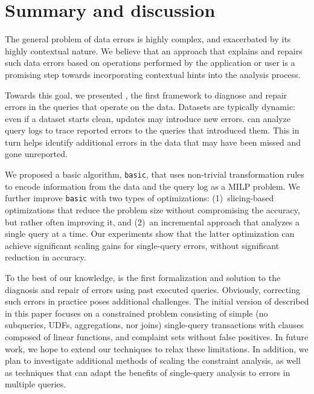 

\section{Summary and discussion}

The general problem of data errors is highly complex, and exacerbated by its highly contextual nature.
We believe that an approach that explains and repairs such data errors based on operations performed by the application or user
is a promising step towards incorporating contextual hints into the analysis process.

Towards this goal, we presented \sys, the first framework to diagnose and
repair errors in the queries that operate on the data.
Datasets are typically dynamic: even if a dataset starts clean,
updates may introduce new errors. \sys can
analyze query logs to trace reported errors to the queries that
introduced them. This in turn helps identify additional errors
in the data that may have been missed and gone unreported.

We proposed a basic algorithm, \texttt{basic}, that uses non-trivial transformation rules to
encode information from the data and the query log as a MILP problem. We further improve 
\texttt{basic} with two types of optimizations: 
(1)~slicing-based optimizations that reduce the problem
size without compromising the accuracy, but rather often improving it, and 
(2)~an incremental approach that analyzes a single query at a time. 
Our experiments show that the latter
optimization can achieve significant scaling gains for single-query
errors, without significant reduction in accuracy.

To the best of our knowledge, \sys is the first formalization and solution to the diagnosis
and repair of errors using past executed queries. 
Obviously, correcting such errors in practice poses additional challenges. 
The initial version of \sys described in this paper focuses on a constrained problem consisting of
simple (no subqueries, UDFs, aggregations, nor joins)
single-query transactions with clauses composed of linear functions, and
complaint sets without false positives.
In future work, we hope to extend our techniques to relax these limitations.
In addition, we plan to investigate additional methods of scaling the constraint analysis, 
as well as techniques that can adapt the benefits of single-query analysis to errors in multiple queries.



